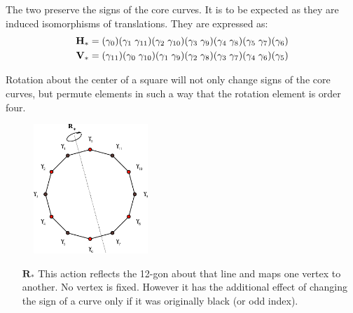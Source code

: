 \documentclass[]{article}
\begin{document}
The two preserve the signs of the core curves. It is to be expected as they are induced isomorphisms of translations. They are expressed as:
\space
\begin{align*}
\mathbf{H}_* &= (\gamma_0)(\gamma_1\hspace{1mm}\gamma_{11})(\gamma_2\hspace{1mm}\gamma_{10})(\gamma_3\hspace{1mm}\gamma_9)(\gamma_4\hspace{1mm}\gamma_8)(\gamma_5\hspace{1mm}\gamma_7)(\gamma_6)\\
\mathbf{V}_* &=(\gamma_{11})(\gamma_0\hspace{1mm}\gamma_{10})(\gamma_1\hspace{1mm}\gamma_{9})(\gamma_2\hspace{1mm}\gamma_8)(\gamma_3\hspace{1mm}\gamma_7)(\gamma_4\hspace{1mm}\gamma_6)(\gamma_5)
\end{align*}

Rotation about the center of a square will not only change signs of the core curves, but permute elements in such a way that the rotation element is order four.

\begin{minipage}{0.4\textwidth}
\begin{figure}[H]\includegraphics[width=1.7in]{12gonR.pdf}
\end{figure}
\end{minipage}
\begin{minipage}{0.55\textwidth}
\vspace{0in}
\begin{itemize}
\item[\textbf{\emph{$\mathbf{R}_*$}}] This action reflects the 12-gon about that line and maps one vertex to another. No vertex is fixed. However it has the additional effect of changing the sign of a curve only if it was originally black (or odd index).
\end{itemize}
\end{minipage}
\end{document}
